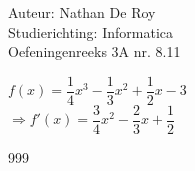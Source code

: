 \documentclass[a4paper]{article}
\begin{document}
  
\noindent \large Auteur: Nathan De Roy \\
\noindent \large Studierichting: Informatica\\
\noindent \large Oefeningenreeks 3A nr. 8.11\\

\medskip

\normalsize

$f(x) = \dfrac{1}{4}x^3 - \dfrac{1}{3}x^2 + \dfrac{1}{2}x - 3$\\

$\Rightarrow f'(x) = \dfrac{3}{4}x^2 - \dfrac{2}{3}x + \dfrac{1}{2}$\\

\begin{thebibliography}{999}
\end{thebibliography}
\end{document}

